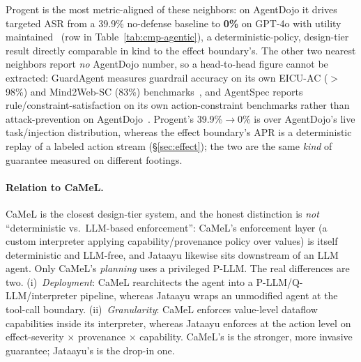 \documentclass[11pt]{article}
\newcommand{\good}[1]{\textcolor{good}{\textbf{#1}}}
\begin{document}
Progent is the most metric-aligned of these neighbors: on AgentDojo it drives targeted ASR from a
39.9\% no-defense baseline to \good{0\%} on GPT-4o with utility maintained~\cite{progent}
(row in Table~\ref{tab:cmp-agentic}), a deterministic-policy, design-tier result directly
comparable in kind to the effect boundary's. The other two nearest neighbors report \emph{no}
AgentDojo number, so a head-to-head figure cannot be extracted: GuardAgent measures guardrail
accuracy on its own EICU-AC ($>$98\%) and Mind2Web-SC (83\%) benchmarks~\cite{guardagent}, and
AgentSpec reports rule/constraint-satisfaction on its own action-constraint benchmarks rather than
attack-prevention on AgentDojo~\cite{agentspec}. Progent's 39.9\%$\to$0\% is over AgentDojo's live
task/injection distribution, whereas the effect boundary's APR is a deterministic replay of a
labeled action stream (\S\ref{sec:effect}); the two are the same \emph{kind} of guarantee measured
on different footings.

\paragraph{Relation to CaMeL.} CaMeL is the closest design-tier system, and the honest distinction
is \emph{not} ``deterministic vs.\ LLM-based enforcement'': CaMeL's enforcement layer (a custom
interpreter applying capability/provenance policy over values) is itself deterministic and LLM-free,
and Jataayu likewise sits downstream of an LLM agent. Only CaMeL's \emph{planning} uses a privileged
P-LLM. The real differences are two. (i)~\emph{Deployment}: CaMeL rearchitects the agent into a
P-LLM/Q-LLM/interpreter pipeline, whereas Jataayu wraps an unmodified agent at the tool-call
boundary. (ii)~\emph{Granularity}: CaMeL enforces value-level dataflow capabilities inside its
interpreter, whereas Jataayu enforces at the action level on effect-severity $\times$ provenance
$\times$ capability. CaMeL's is the stronger, more invasive guarantee; Jataayu's is the drop-in one.
\end{document}
